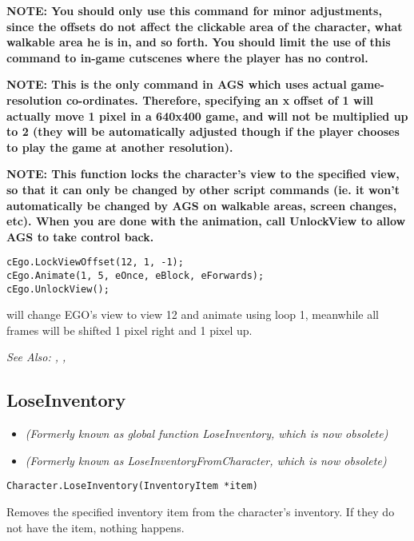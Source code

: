 \bf{NOTE:} You should only use this command for minor adjustments, since the offsets do not
affect the clickable area of the character, what walkable area he is in, and so forth. You
should limit the use of this command to in-game cutscenes where the player has no control.

\bf{NOTE:} This is the only command in AGS which uses actual game-resolution co-ordinates.
Therefore, specifying an x offset of 1 will actually move 1 pixel in a 640x400 game, and will
not be multiplied up to 2 (they will be automatically adjusted though if the player chooses
to play the game at another resolution).

\bf{NOTE:} This function locks the character's view to the specified view, so
that it can only be changed by other script commands (ie. it won't
automatically be changed by AGS on walkable areas, screen changes, etc). When
you are done with the animation, call UnlockView to allow AGS to take control back.

\begin{verbatim}
cEgo.LockViewOffset(12, 1, -1);
cEgo.Animate(1, 5, eOnce, eBlock, eForwards);
cEgo.UnlockView();
\end{verbatim}
will change EGO's view to view 12 and animate using loop 1, meanwhile all frames will be
shifted 1 pixel right and 1 pixel up.

\it{See Also:} ,
,


\subsection{LoseInventory}\label{Character.LoseInventory}%

\begin{itemize}
\item \it{(Formerly known as global function LoseInventory, which is now obsolete)}
\item \it{(Formerly known as LoseInventoryFromCharacter, which is now obsolete)}
\end{itemize}

\begin{verbatim}
Character.LoseInventory(InventoryItem *item)
\end{verbatim}
Removes the specified inventory item from the character's inventory.
If they do not have the item, nothing happens.

